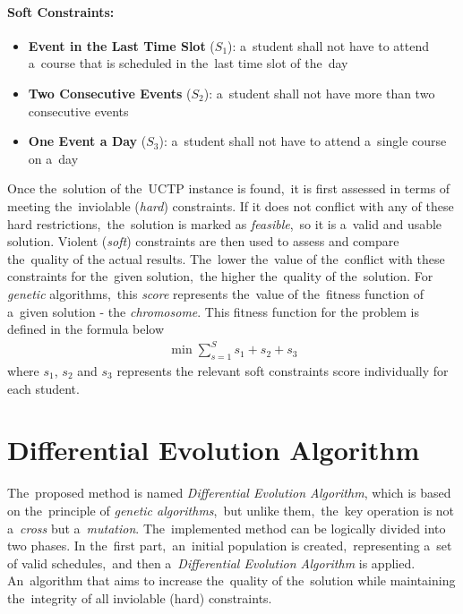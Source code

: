 \paragraph{Soft Constraints:}
\begin{itemize}
    \item \textbf{Event in the Last Time Slot} ($S_1$): a~student shall not have to attend a~course that is scheduled in the~last time slot of the~day
    \item \textbf{Two Consecutive Events} ($S_2$): a~student shall not have more than two consecutive events
    \item \textbf{One Event a Day} ($S_3$): a~student shall not have to attend a~single course on a~day
\end{itemize}
Once the~solution of the~UCTP instance is found,~it is first assessed in terms of meeting the~inviolable (\textit{hard}) constraints.
If it does not conflict with any of these hard restrictions,~the~solution is marked as \textit{feasible},~so it is a~valid and usable solution.
Violent (\textit{soft}) constraints are then used to assess and compare the~quality of the actual results.
The~lower the~value of the~conflict with these constraints for the~given solution,~the higher the~quality of the~solution.
For \textit{genetic} algorithms,~this \textit{score} represents the~value of the~fitness function of a~given solution - the \textit{chromosome}.
This fitness function for the problem is defined in the
formula below
\begin{align*}
    \min \sum_{s=1}^{S}{s_1 + s_2 + s_3}
\end{align*}
where $s_1$, $s_2$ and $s_3$ represents the relevant soft constraints score individually for each student.

\section{Differential Evolution Algorithm} \label{sec:method}
The~proposed method is named \textit{Differential Evolution Algorithm}, which is based on the~principle of \textit{genetic algorithms},~but unlike them,~the~key operation is not a~\textit{cross} but a~\textit{mutation}.
The~implemented method can be logically divided into two phases. 
In the~first part,~an~initial population is created,~representing a~set of valid schedules,~and then a~\textit{Differential Evolution Algorithm} is applied. 
An~algorithm that aims to increase the~quality of the~solution while maintaining the~integrity of all inviolable (hard) constraints.


